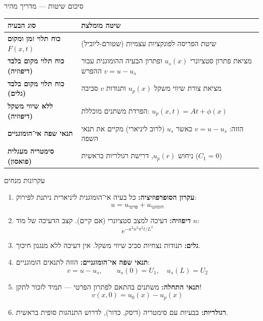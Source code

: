 \begin{theorembox}{סיכום שיטות — מדריך מהיר}
\begin{center}
\renewcommand{\arraystretch}{1.6}
\begin{tabular}{|p{4.5cm}|p{7cm}|}
\hline
\textbf{סוג הבעיה} & \textbf{שיטה מומלצת} \\
\hline
\textbf{כוח תלוי זמן ומקום} $F(x,t)$ & שיטת הפריסה לפונקציות עצמיות (שטורם-ליוביל) \\
\hline
\textbf{כוח תלוי מקום בלבד (דיפוזיה)} & מציאת פתרון סטציונרי $u_s(x)$ ופתרון הבעיה ההומוגנית עבור ההפרש $v = u - u_s$ \\
\hline
\textbf{כוח תלוי מקום בלבד (גלים)} & מציאת צורת שיווי משקל $u_p(x)$ ותנודות $v$ סביבה \\
\hline
\textbf{ללא שיווי משקל (דיפוזיה)} & הפרדת משתנים מוכללת: $u_p(x,t) = At + \phi(x)$ \\
\hline
\textbf{תנאי שפה אי־הומוגניים} & הזזה: $v = u - u_s$ כאשר $u_s$ (לרוב ליניארי) מקיים את תנאי השפה \\
\hline
\textbf{סימטריה מעגלית (פואסון)} & ניחוש $u_p(r)$, דרישת רגולריות בראשית ($C_1 = 0$) \\
\hline
\end{tabular}
\end{center}
\end{theorembox}

\begin{summarybox}{עקרונות מנחים }
\begin{enumerate}
    \item \textbf{עקרון הסופרפוזיציה:} כל בעיה אי־הומוגנית ליניארית ניתנת לפירוק:
    \[
    u = u_{\text{פרטי}} + u_{\text{הומוגני}}
    \]
    
    \item \textbf{דיפוזיה:} דעיכה למצב סטציונרי (אם קיים). קצב הדעיכה של מוד $n$:
    \[
    e^{-a^2 n^2 \pi^2 t/L^2}
    \]
    
    \item \textbf{גלים:} תנודות נצחיות סביב שיווי משקל. אין דעיכה ללא מנגנון חיכוך.
    
    \item \textbf{תנאי שפה אי־הומוגניים:} הזזה לתנאים הומוגניים:
    \[
    v = u - u_s, \qquad u_s(0) = U_1, \quad u_s(L) = U_2
    \]
    
    \item \textbf{תנאי התחלה:} משתנים בהתאם לפתרון הפרטי — תמיד לזכור לתקן!
    \[
    v(x,0) = u_0(x) - u_p(x)
    \]
    
    \item \textbf{רגולריות:} בבעיות עם סימטריה (דיסק, כדור), לדרוש התנהגות סופית בראשית.
\end{enumerate}
\end{summarybox}